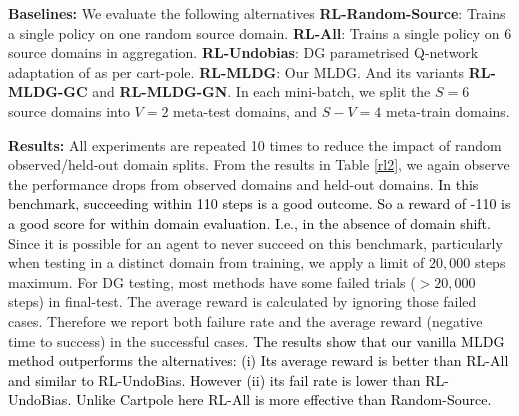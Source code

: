 \documentclass[letterpaper]{article} \usepackage{aaai18}  \usepackage{times}  \usepackage{helvet}  \usepackage{courier}  \usepackage{url}  \usepackage{graphicx}  \usepackage{amsmath}
\newcommand{\keypoint}[1]{\vspace{0.1cm}\noindent\textbf{#1}\quad}
\begin{document}
{\keypoint{Baselines:} We evaluate the following alternatives \quad \textbf{RL-Random-Source}: Trains a single policy on one random source domain. \textbf{RL-All}: Trains a single policy on 6 source domains in aggregation. \textbf{RL-Undobias}: DG parametrised Q-network adaptation of \cite{khosla2012undoing,da2017dg} as per cart-pole. \textbf{RL-MLDG}: Our  MLDG. And its variants \textbf{RL-MLDG-GC} and \textbf{RL-MLDG-GN}. In each mini-batch, we split the $S=6$ source domains into $V=2$ meta-test domains, and $S-V=4$ meta-train domains.

\begin{table}[t]
\centering
\caption{Domain generalisation performance for mountain car. Failure rate ($\downarrow$) and reward ($\uparrow$) on held out testing domains with random mountain heights.}
\label{rl2}
\end{table}


\keypoint{Results:} All experiments are repeated 10 times to reduce the impact of random observed/held-out domain splits. From the results in Table \ref{rl2}, we again observe the performance drops from observed domains and held-out domains.
\textcolor{black}{In this benchmark, succeeding within 110 steps is a good outcome. So a reward of -110 is a good score for within domain evaluation. I.e., in the absence of domain shift.} Since it is possible for an agent to never succeed on this benchmark, particularly when testing in a distinct domain from training, we apply a limit of $20,000$ steps maximum. 
For DG testing, most methods have some failed trials ($>20,000$ steps) in final-test. 
The average reward is calculated by ignoring those failed cases. Therefore we report both failure rate and the average reward (negative time to success) in the successful cases. 
\textcolor{black}{The results show that our vanilla MLDG method outperforms the alternatives: (i) Its average reward is better than RL-All and similar to RL-UndoBias. However (ii) its fail rate is lower than RL-UndoBias. Unlike Cartpole here RL-All is more effective than Random-Source.}

}
\end{document}
